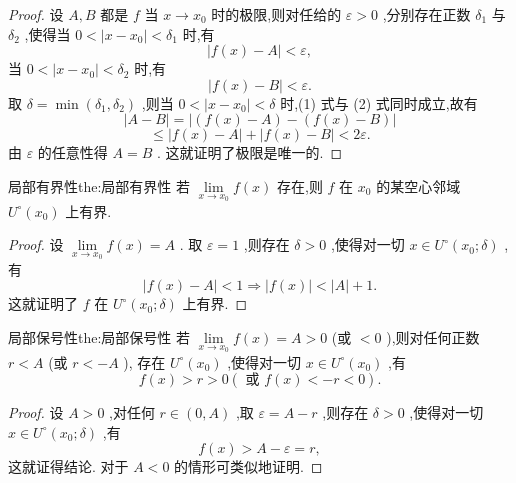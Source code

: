 \begin{proof}
设 \(A,B\) 都是 \(f\) 当 \(x \rightarrow  {x}_{0}\) 时的极限,则对任给的 \(\varepsilon  > 0\) ,分别存在正数 \({\delta }_{1}\) 与 \({\delta }_{2}\) ,使得当 \(0 < \left| {x - {x}_{0}}\right|  < {\delta }_{1}\) 时,有
\[
\left| {f\left( x\right)  - A}\right|  < \varepsilon , \tag{1}
\]
当 \(0 < \left| {x - {x}_{0}}\right|  < {\delta }_{2}\) 时,有
\[
\left| {f\left( x\right)  - B}\right|  < \varepsilon . \tag{2}
\]
取 \(\delta  = \min \left( {{\delta }_{1},{\delta }_{2}}\right)\) ,则当 \(0 < \left| {x - {x}_{0}}\right|  < \delta\) 时,(1) 式与 (2) 式同时成立,故有
\[
\left| {A - B}\right|  = \left| {\left( {f\left( x\right)  - A}\right)  - \left( {f\left( x\right)  - B}\right) }\right|
\]
\[
\leq  \left| {f\left( x\right)  - A}\right|  + \left| {f\left( x\right)  - B}\right|  < {2\varepsilon }.
\]
由 \(\varepsilon\) 的任意性得 \(A = B\) . 这就证明了极限是唯一的.
\end{proof}


\begin{theorem}{局部有界性}{the:局部有界性}
若 \(\mathop{\lim }\limits_{{x \rightarrow  {x}_{0}}}f\left( x\right)\) 存在,则 \(f\) 在 \({x}_{0}\) 的某空心邻域 \({U}^{ \circ  }\left( {x}_{0}\right)\) 上有界.
\end{theorem}


\begin{proof}
设 \(\mathop{\lim }\limits_{{x \rightarrow  {x}_{0}}}f\left( x\right)  = A\) . 取 \(\varepsilon  = 1\) ,则存在 \(\delta  > 0\) ,使得对一切 \(x \in  {U}^{ \circ  }\left( {{x}_{0};\delta }\right)\) ,有
\[
\left| {f\left( x\right)  - A}\right|  < 1 \Rightarrow  \left| {f\left( x\right) }\right|  < \left| A\right|  + 1.
\]
这就证明了 \(f\) 在 \({U}^{ \circ  }\left( {{x}_{0};\delta }\right)\) 上有界.
\end{proof}


\begin{theorem}{局部保号性}{the:局部保号性}
若 \(\mathop{\lim }\limits_{{x \rightarrow  {x}_{0}}}f\left( x\right)  = A > 0\) (或 \(< 0\) ),则对任何正数 \(r < A\) (或 \(r <  - A\) ), 存在 \({U}^{ \circ  }\left( {x}_{0}\right)\) ,使得对一切 \(x \in  {U}^{ \circ  }\left( {x}_{0}\right)\) ,有
\[
f\left( x\right)  > r > 0\left( {\text{ 或 }f\left( x\right)  <  - r < 0}\right) .
\]
\end{theorem}

\begin{proof}
设 \(A > 0\) ,对任何 \(r \in  \left( {0,A}\right)\) ,取 \(\varepsilon  = A - r\) ,则存在 \(\delta  > 0\) ,使得对一切 \(x \in  {U}^{ \circ  }\left( {{x}_{0};\delta }\right)\) ,有
\[
f\left( x\right)  > A - \varepsilon  = r,
\]
这就证得结论. 对于 \(A < 0\) 的情形可类似地证明.
\end{proof}


